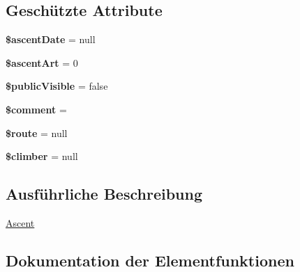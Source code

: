\subsection*{Geschützte Attribute}
\begin{DoxyCompactItemize}
\item 
\mbox{\label{classCsp_1_1Pinkpoint_1_1Domain_1_1Model_1_1Ascent_a05b7bb6c73cff09f9f79c97159cad819}} 
{\bfseries \$ascent\+Date} = null
\item 
\mbox{\label{classCsp_1_1Pinkpoint_1_1Domain_1_1Model_1_1Ascent_ae244561792b70fc1ffb640c175e52cc9}} 
{\bfseries \$ascent\+Art} = 0
\item 
\mbox{\label{classCsp_1_1Pinkpoint_1_1Domain_1_1Model_1_1Ascent_abdd4e44c99229ede797fef3e105fa632}} 
{\bfseries \$public\+Visible} = false
\item 
\mbox{\label{classCsp_1_1Pinkpoint_1_1Domain_1_1Model_1_1Ascent_a20cb0e130fc209f38cd354bd5e5038c3}} 
{\bfseries \$comment} = \textquotesingle{}\textquotesingle{}
\item 
\mbox{\label{classCsp_1_1Pinkpoint_1_1Domain_1_1Model_1_1Ascent_a92d73bfdeb6e91edbbab0aa3f57a5759}} 
{\bfseries \$route} = null
\item 
\mbox{\label{classCsp_1_1Pinkpoint_1_1Domain_1_1Model_1_1Ascent_a0f3e207fe8b91013b8b5fd0372fa9283}} 
{\bfseries \$climber} = null
\end{DoxyCompactItemize}


\subsection{Ausführliche Beschreibung}
\hyperlink{classCsp_1_1Pinkpoint_1_1Domain_1_1Model_1_1Ascent}{Ascent} 

\subsection{Dokumentation der Elementfunktionen}
\mbox{\label{classCsp_1_1Pinkpoint_1_1Domain_1_1Model_1_1Ascent_a0f9d1b317ddd1558b5854666ecd41282}} 

